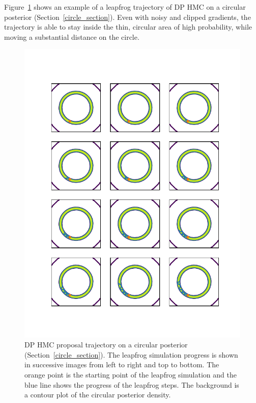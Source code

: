 \documentclass[english,twoside,openright]{HYgraduMLDS}
\begin{document}
Figure~\ref{hmc_trajectory_fig} shows an example of a leapfrog trajectory
of DP HMC on a circular posterior (Section~\ref{circle_section}).
Even with noisy and clipped gradients,
the trajectory is able to stay inside the thin, circular area of high probability,
while moving a substantial distance on the circle.

\begin{figure}[h]
	\centering
  \includegraphics[width=\textwidth]{figures/hmc_trajectory}
  \caption{
    DP HMC proposal trajectory on a circular posterior
    (Section~\ref{circle_section}). The leapfrog simulation progress is shown
    in successive images from left to right and top to bottom.
    The orange point is the starting
    point of the leapfrog simulation and the blue line shows the progress
    of the leapfrog steps. The background is a contour plot of the circular
    posterior density.
  }
  \label{hmc_trajectory_fig}
\end{figure}
\end{document}

